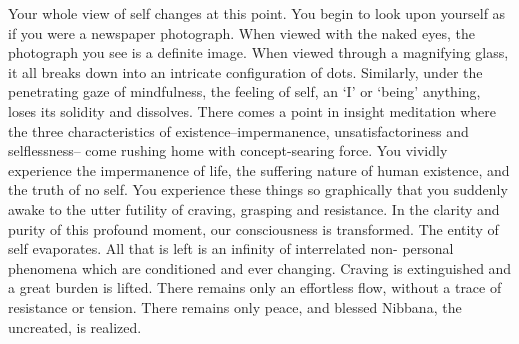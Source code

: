 Your whole view of self changes at this point. You begin to look upon yourself
as if you were a newspaper photograph. When viewed with the naked eyes, the
photograph you see is a definite image. When viewed through a magnifying glass,
it all breaks down into an intricate configuration of dots. Similarly, under the
penetrating gaze of mindfulness, the feeling of self, an `I' or `being'
anything, loses its solidity and dissolves. There comes a point in insight
meditation where the three characteristics of existence--impermanence,
unsatisfactoriness and selflessness-- come rushing home with concept-searing
force. You vividly experience the impermanence of life, the suffering nature of
human existence, and the truth of no self. You experience these things so
graphically that you suddenly awake to the utter futility of craving, grasping
and resistance. In the clarity and purity of this profound moment, our
consciousness is transformed. The entity of self evaporates. All that is left is
an infinity of interrelated non- personal phenomena which are conditioned and
ever changing. Craving is extinguished and a great burden is lifted. There
remains only an effortless flow, without a trace of resistance or tension. There
remains only peace, and blessed Nibbana, the uncreated, is realized.
